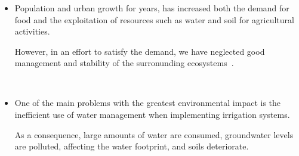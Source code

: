 \begin{frame}
	\frametitle{\secname}
	\begin{minipage}{0.6\textwidth}
		\begin{itemize}
			\item
			      Population and urban growth for years, has increased
			      both the demand for food and the exploitation of
			      resources such as \alert{water} and \alert{soil} for
			      agricultural activities.

			      However, in an effort to satisfy the demand, we have
			      neglected good management and stability of the surronunding
			      ecosystems~\cite{Latham1997}.

			      \

			\item

			      One of the main problems with the greatest environmental
			      impact is the \alert{inefficient use of water management}
			      when implementing irrigation systems.

			      As a consequence,
			      large amounts of water are consumed, groundwater levels
			      are polluted, affecting the water footprint, and soils
			      deteriorate.


\end{itemize}
\end{minipage}
\end{frame}
